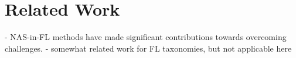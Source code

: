 \chapter{Related Work}

- NAS-in-FL methods have made significant contributions towards overcoming challenges.
- somewhat related work for FL taxonomies, but not applicable here